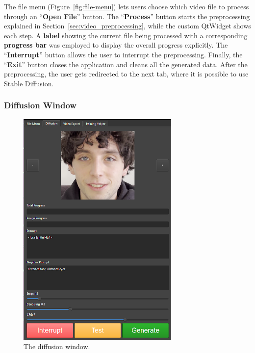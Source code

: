 \documentclass[preprint]{elsarticle}
\begin{document}
The file menu (Figure~\ref{fig:file-menu}) lets users choose which video file to process through 
an ``\textbf{Open File}'' button. 
The ``\textbf{Process}'' button starts the preprocessing explained in Section~\ref{sec:video_preprocessing}, 
while the custom QtWidget shows each step. 
A \textbf{label} showing the current file being processed with a corresponding \textbf{progress bar} 
was employed to display the overall progress explicitly. 
The ``\textbf{Interrupt}'' button allows the user to interrupt the preprocessing. 
Finally, the ``\textbf{Exit}'' button closes the application and cleans all the generated data. 
After the preprocessing, the user gets redirected to the next tab,
where it is possible to use Stable Diffusion. 



\subsubsection{Diffusion Window}

\begin{figure}[H]
	\centering
	\includegraphics[scale=0.4, keepaspectratio]{img/project_img/generation-window.png}
	\caption{The diffusion window.}
	\label{fig:diffusion-menu}
\end{figure}
\end{document}
